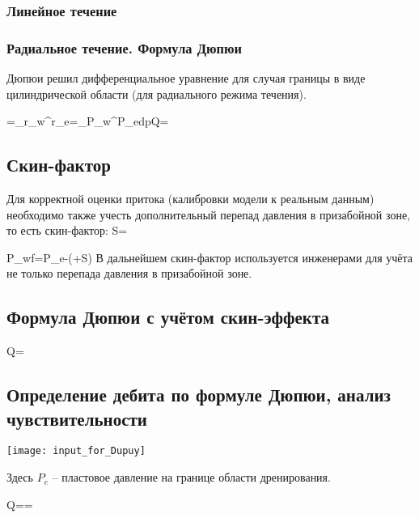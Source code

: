 \documentclass[main.tex]{subfiles}
\begin{document}
\subsubsection{Линейное течение}


\subsubsection{Радиальное течение. Формула Дюпюи}

Дюпюи решил дифференциальное уравнение для случая границы в виде цилиндрической области (для радиального режима течения).

\beq
{}=\Rightarrow{}\int\limits_{r_w}^{r_e}{}=\int\limits_{P_w}^{P_e}{dp}\Rightarrow Q=
\eeq

\subsection{Скин-фактор}

Для корректной оценки притока (калибровки модели к реальным данным) необходимо также учесть дополнительный перепад давления в призабойной зоне, то есть скин-фактор:
\beq
S=
\eeq

\beq
P_{wf}=P_e-\left(+S\right)
\eeq
В дальнейшем скин-фактор используется инженерами для учёта не только перепада давления в призабойной зоне.


\subsection{Формула Дюпюи с учётом скин-эффекта}

\beq
Q=
\eeq

\subsection{Определение дебита по формуле Дюпюи, анализ чувствительности}

\texttt{[image: input\_for\_Dupuy]}

Здесь $P_e$ -- пластовое давление на границе области дренирования.

\beq
Q==
\eeq
\end{document}
